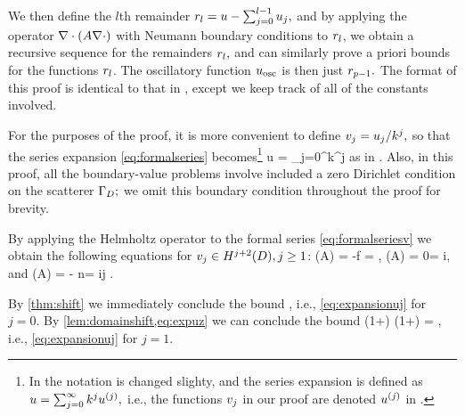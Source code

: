 We then define the $l$th remainder $r_{l} = u - \sum_{j=0}^{l-1} u_{j},$ and by applying the operator $\grad\cdot\mleft(A\grad \cdot\mright)$ with Neumann boundary conditions to $r_{l}$, we obtain a recursive sequence for the remainders $r_{l},$ and can similarly prove a priori bounds for the functions $r_{l}$. The oscillatory function $u_{\mathrm{osc}}$ is then just $r_{p-1}.$ The format of this proof is identical to that in \cite[Theorem 1]{ChNi:19}, except we keep track of all of the constants involved.

For the purposes of the proof, it is more convenient to define $v_{j} = u_{j}/k^j,$ so that the series expansion \cref{eq:formalseries} becomes\footnote{In \cite{ChNi:19} the notation is changed slighty, and the series expansion is defined as $u = \sum_{j=0}^\infty k^j u^{(j)},$ i.e., the functions $v_{j}$ in our proof are denoted $u^{(j)}$ in \cite{ChNi:19}.}
\beq\label{eq:formalseriesv}
u = \sum_{j=0}^\infty k^j\vj
\eeq
as in \cite{ChNi:19}. Also, in this proof, all the boundary-value problems involve included a zero Dirichlet condition on the scatterer $\Gamma_{D};$ we omit this boundary condition throughout the proof for brevity.

By applying the Helmholtz operator to the formal series \eqref{eq:formalseriesv} we obtain the following equations for $\vj \in \HjptD, j \geq 1$:
\beqs
\grad \cdot \mleft(A\grad \vz\mright) = -f \quad\tand\quad \dn \vz = \gI,
\eeqs
\beqs
\grad \cdot \mleft(A\grad \vo\mright) = 0\quad\tand\quad\dn \vo = i\vz,
\eeqs
and
\beq\label{eq:vj}
\grad \cdot \mleft(A\grad \vj\mright) = - n\vjmt\quad\tand\quad\dn \vz = i\vjmo \quad\tfor j \in \mleft[2,p-2\mright].
\eeq

By \cref{thm:shift} we immediately conclude the bound
\beq\label{eq:expuz}
\NHtD{\vz} \leq \CAz\Cfg \leq {}\Cfg,
\eeq
i.e., \cref{eq:expansionuj} for $j=0.$ By \cref{lem:domainshift,eq:expuz} we can conclude the bound
\beqs
\NHthD{\vo} \leq \CAo \mleft(1+\CTrt\mright) \leq \max{}\mleft(1+\mright) \Cfg = \Cfg,
\eeqs
i.e., \cref{eq:expansionuj} for $j=1$.

